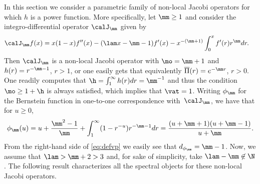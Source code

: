 In this section we consider a parametric family of non-local Jacobi operators for which $h$ is a power function. More specifically, let $\mm \geq 1$ and consider the integro-differential operator $\calJ_\mm$ given by
\begin{align*}
\calJ_{\mm} f(x) &= x(1-x)f''(x) - (\lam x - \mm-1)f'(x)- x^{-(\mm+1)}\int_0^{x} f'(r)r^{\mm}dr.
\end{align*}
Then $\calJ_\mm$ is a non-local Jacobi operator with $\mo = \mm+1$ and $h(r) = r^{-\mm-1}$, $r>1$, or one easily gets that equivalently $\overline{\Pi}(r) = e^{-\mm r}$, $r > 0$. One readily computes that $\h = \int_1^\infty h(r)dr = \mm^{-1}$ and thus the condition $\mo \geq 1+\h$ is always satisfied, which implies that $\vat = 1$. Writing $\phi_\mm$ for the Bernstein function in one-to-one correspondence with~$\calJ_\mm$, we have that for $u \geq 0$,
\begin{equation}
\label{eq:defvp}
\phi_{\mm}(u) = u + \frac{\mm^2-1}{\mm} + \int_1^\infty (1-r^{-u})r^{-\mm-1}dr = \frac{(u+\mm+1)(u+\mm-1)}{u + \mm}.\end{equation}
From the right-hand side of \eqref{eq:defvp} we easily see that $d_{\phi_\mm} = \mm-1$. Now, we assume that $\lam >\mm+2 > 3$ and, for sake of simplicity, take $\lam - \mm \not\in \N$. The following result characterizes all the spectral objects for these non-local Jacobi operators.


